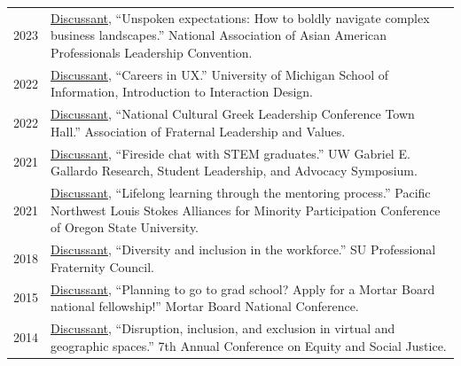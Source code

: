 \documentclass[12pt]{article}
\begin{document}
{\begin{longtable}{R{0.75in}p{5.0in}}
\footnotesize{2023} &
\href{https://web.archive.org/web/20230826203812/https://www.leadershipconvention.org/workplace-visionaries-track}{Discussant}, ``Unspoken expectations: How to boldly navigate complex business landscapes.'' National Association of Asian American Professionals Leadership Convention.\\

\footnotesize{2022} & 
\href{https://drive.google.com/file/d/187KVJ4FccmrYuKKrR3jHLQMmVObZv3VA/view?usp=sharing}{Discussant}, ``Careers in UX.'' University of Michigan School of Information, Introduction to Interaction Design.\\

\footnotesize{2022} & 
\href{https://web.archive.org/web/20230726033714/https://www.aflv.org/page/NCGLC}{Discussant}, ``National Cultural Greek Leadership Conference Town Hall.'' Association of Fraternal Leadership and Values.\\

\footnotesize{2021} & 
\href{https://web.archive.org/web/20210621134003/https://www.washington.edu/uwmcnair/annual-mcnair-conference-2/2021-conference-program/}{Discussant}, ``Fireside chat with STEM graduates.'' UW Gabriel E. Gallardo Research, Student Leadership, and Advocacy Symposium.\\

\footnotesize{2021} & \href{https://web.archive.org/web/20211201001749/https://www.lsampalumni.com/uploads/1/3/4/9/134987031/2020_-_2021_nala_report_.pdf}{Discussant}, ``Lifelong learning through the mentoring process.'' Pacific Northwest Louis Stokes Alliances for Minority Participation Conference of Oregon State University.\\

\footnotesize{2018} & \href{https://www.facebook.com/events/170505843576915/}{Discussant}, ``Diversity and inclusion in the workforce.'' SU Professional Fraternity Council.\\

\footnotesize{2015} & \href{https://web.archive.org/web/20210326175437/https://www.mortarboard.org/Docs/2015\%20CONFERENCE\%20PROGRAM.pdf}{Discussant}, ``Planning to go to grad school? Apply for a Mortar Board national fellowship!'' Mortar Board National Conference. \\

\footnotesize{2014} & \href{https://web.archive.org/web/20150129171123/http://7thannualconferenceonequity2014.sched.org/list/descriptions/}{Discussant}, ``Disruption, inclusion, and exclusion in virtual and geographic spaces.'' 7th Annual Conference on Equity and Social Justice.\\


\end{longtable}}
\end{document}
